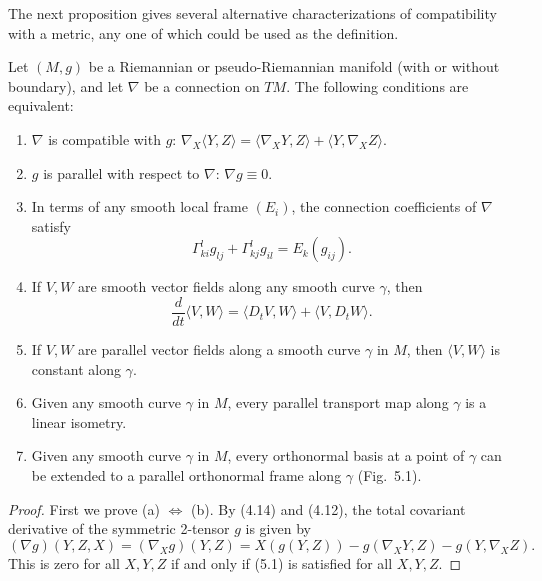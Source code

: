 The next proposition gives several alternative characterizations of compatibility with a metric, any one of which could be used as the definition.

\begin{proposition}
\label{prop:characterizations-of-metric-connections}

Let $(M,g)$ be a Riemannian or pseudo-Riemannian manifold (with or without boundary), and let $\nabla$ be a connection on $TM$. The following conditions are equivalent:
\begin{enumerate}
\item[(a)] $\nabla$ is compatible with $g$: $\nabla_X\langle Y,Z \rangle = \langle \nabla_X Y, Z \rangle + \langle Y, \nabla_X Z \rangle$.
\item[(b)] $g$ is parallel with respect to $\nabla$: $\nabla g \equiv 0$.
\item[(c)] In terms of any smooth local frame $(E_i)$, the connection coefficients of $\nabla$ satisfy
\begin{equation}
\Gamma^l_{ki}g_{lj} + \Gamma^l_{kj}g_{il} = E_k(g_{ij}). \tag{5.2}
\end{equation}
\item[(d)] If $V, W$ are smooth vector fields along any smooth curve $\gamma$, then
\begin{equation}
\frac{d}{dt}\langle V,W\rangle = \langle D_t V, W\rangle + \langle V, D_t W\rangle. \tag{5.3}
\end{equation}
\item[(e)] If $V, W$ are parallel vector fields along a smooth curve $\gamma$ in $M$, then $\langle V,W\rangle$ is constant along $\gamma$.
\item[(f)] Given any smooth curve $\gamma$ in $M$, every parallel transport map along $\gamma$ is a linear isometry.
\item[(g)] Given any smooth curve $\gamma$ in $M$, every orthonormal basis at a point of $\gamma$ can be extended to a parallel orthonormal frame along $\gamma$ (Fig.\ 5.1).
\end{enumerate}


\begin{proof}
First we prove (a) $\Leftrightarrow$ (b). By (4.14) and (4.12), the total covariant derivative of the symmetric 2-tensor $g$ is given by
\[
(\nabla g)(Y,Z,X) = (\nabla_X g)(Y,Z) = X(g(Y,Z)) - g(\nabla_X Y,Z) - g(Y,\nabla_X Z).
\]
This is zero for all $X,Y,Z$ if and only if (5.1) is satisfied for all $X,Y,Z$.


\end{proof}
\end{proposition}
